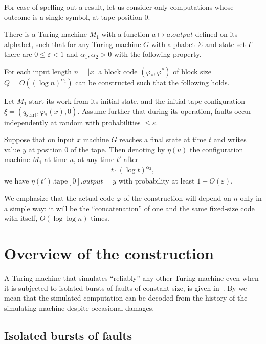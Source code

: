 \documentclass[12pt]{memoir}
\renewcommand{\le}{\leq}
\newcommand{\Output}{\mathit{output}}
\newcommand{\start}{\mathrm{start}}
\newcommand{\tape}{\mathrm{tape}}
\begin{document}
For ease of spelling out a result, let us consider only computations whose outcome
is a single symbol, at tape position 0.

\begin{theorem}\label{thm:main-main}
There is a Turing machine \( M_{1} \) with a 
function \( a\mapsto a.\Output \) defined on its alphabet, 
such that
for any Turing machine \( G \) with alphabet \( \Sigma \) and state set \( \Gamma \)
there are \( 0\le\varepsilon <1 \) and \( \alpha_{1},\alpha_{2}>0 \) 
with the following property.

For each input length \( n=|x| \) a block code
\( (\varphi_*, \varphi^*) \) of block size \( Q=O((\log n)^{\alpha_{1}}) \) can be constructed 
such that the following holds.

Let \( M_1 \) start its work from its initial state,
and the initial tape configuration \( \xi=(q_{\start},\varphi_{*}(x),0) \).
Assume further that
during its operation, faults occur independently at random
with probabilities \( \le \varepsilon \).

Suppose that on input \( x \) machine \( G \) reaches a final state at time \( t \) and writes
value \( y \) at position 0 of the tape.
Then denoting by \( \eta(u) \) the configuration machine \( M_{1} \) at time \( u \),
at any time \( t' \) after
 \begin{align*}
   t\cdot (\log t)^{\alpha_{2}},
 \end{align*}
we have \( \eta(t').\tape[0].\Output= y \)
with probability at least \( 1 - O(\varepsilon) \).
\end{theorem}

We emphasize that the actual
code \( \varphi \) of the construction will depend on \( n \) only in a simple way:
it will be the ``concatenation'' of one and the same fixed-size
code with itself, \( O(\log\log n) \) times.


\section{Overview of the construction}

A Turing machine that simulates ``reliably'' any other
Turing machine even when it is subjected to isolated bursts of faults of constant size,
is given in~\cite{burstyTuring13}.
By  we mean that the 
simulated computation can be decoded from the history
of the simulating machine despite occasional damages.


\subsection{Isolated bursts of faults}\label{sec:bursts}
\end{document}
